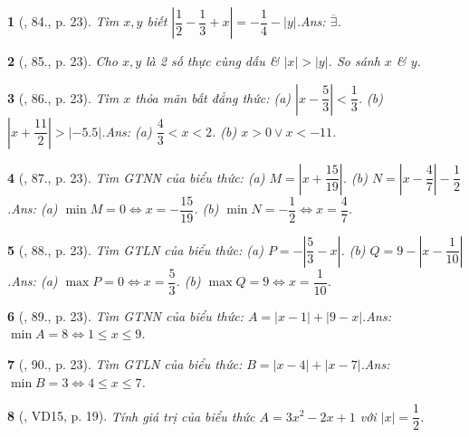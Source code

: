 \documentclass{article}
\newtheorem{baitoan}{}
\begin{document}
\begin{baitoan}[\cite{Tuyen_Toan_7}, 84., p. 23]
	Tìm $x,y$ biết $\left|\dfrac{1}{2} - \dfrac{1}{3} + x\right| = -\dfrac{1}{4} - |y|$.\hfill{\sf Ans:} $\overline{\exists}$.
\end{baitoan}

\begin{baitoan}[\cite{Tuyen_Toan_7}, 85., p. 23]
	Cho $x,y$ là 2 số thực cùng dấu \& $|x| > |y|$. So sánh $x$ \& $y$.
\end{baitoan}

\begin{baitoan}[\cite{Tuyen_Toan_7}, 86., p. 23]
	Tìm $x$ thỏa mãn bất đẳng thức: (a) $\left|x - \dfrac{5}{3}\right| < \dfrac{1}{3}$. (b) $\left|x + \dfrac{11}{2}\right| > |-5.5|$.\hfill{\sf Ans:} (a) $\dfrac{4}{3} < x < 2$. (b) $x > 0\lor x < -11$.
\end{baitoan}

\begin{baitoan}[\cite{Tuyen_Toan_7}, 87., p. 23]
	Tìm {\rm GTNN} của biểu thức: (a) $M = \left|x + \dfrac{15}{19}\right|$. (b) $N = \left|x - \dfrac{4}{7}\right| - \dfrac{1}{2}$.\hfill{\sf Ans:} (a) $\min M = 0\Leftrightarrow x = -\dfrac{15}{19}$. (b) $\min N = -\dfrac{1}{2}\Leftrightarrow x = \dfrac{4}{7}$.
\end{baitoan}

\begin{baitoan}[\cite{Tuyen_Toan_7}, 88., p. 23]
	Tìm {\rm GTLN} của biểu thức: (a) $P = -\left|\dfrac{5}{3} - x\right|$. (b) $Q = 9 - \left|x - \dfrac{1}{10}\right|$.\hfill{\sf Ans:} (a) $\max P = 0\Leftrightarrow x = \dfrac{5}{3}$. (b) $\max Q = 9\Leftrightarrow x = \dfrac{1}{10}$.
\end{baitoan}

\begin{baitoan}[\cite{Tuyen_Toan_7}, 89., p. 23]
	Tìm {\rm GTNN} của biểu thức: $A = |x - 1| + |9 - x|$.\hfill{\sf Ans:} $\min A = 8\Leftrightarrow 1\le x\le 9$.
\end{baitoan}

\begin{baitoan}[\cite{Tuyen_Toan_7}, 90., p. 23]
	Tìm {\rm GTLN} của biểu thức: $B = |x - 4| + |x - 7|$.\hfill{\sf Ans:} $\min B = 3\Leftrightarrow 4\le x\le 7$.
\end{baitoan}

\begin{baitoan}[\cite{Binh_Toan_7_tap_1}, VD15, p. 19]
	Tính giá trị của biểu thức $A = 3x^2 - 2x + 1$ với $|x| = \dfrac{1}{2}$.
\end{baitoan}
\end{document}
